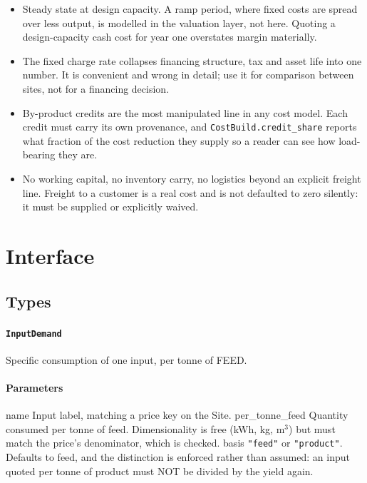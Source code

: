 \documentclass[10pt,a4paper,twoside]{report}
\begin{document}
\begin{itemize}
\item Steady state at design capacity. A ramp period, where fixed costs are spread over less output, is modelled in the valuation layer, not here. Quoting a design-capacity cash cost for year one overstates margin materially.
\item The fixed charge rate collapses financing structure, tax and asset life into one number. It is convenient and wrong in detail; use it for comparison between sites, not for a financing decision.
\item By-product credits are the most manipulated line in any cost model. Each credit must carry its own provenance, and \texttt{CostBuild.credit\_share} reports what fraction of the cost reduction they supply so a reader can see how load-bearing they are.
\item No working capital, no inventory carry, no logistics beyond an explicit freight line. Freight to a customer is a real cost and is not defaulted to zero silently: it must be supplied or explicitly waived.
\end{itemize}

\section{Interface}

\subsection*{Types}

\paragraph{\texttt{InputDemand}}

Specific consumption of one input, per tonne of FEED.

\paragraph*{Parameters}

name Input label, matching a price key on the Site. per\_tonne\_feed Quantity consumed per tonne of feed. Dimensionality is free (kWh, kg, m$^{3}$) but must match the price's denominator, which is checked. basis \texttt{"feed"} or \texttt{"product"}. Defaults to feed, and the distinction is enforced rather than assumed: an input quoted per tonne of product must NOT be divided by the yield again.
\end{document}
